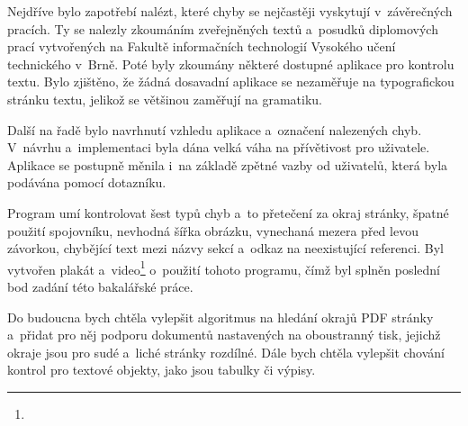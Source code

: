 Nejdříve bylo zapotřebí nalézt, které chyby se nejčastěji vyskytují v~závěrečných
pracích. Ty se nalezly zkoumáním zveřejněných textů a~posudků diplomových prací
vytvořených na Fakultě informačních technologií Vysokého učení technického v~Brně.
Poté byly zkoumány některé dostupné aplikace pro kontrolu textu. Bylo zjištěno,
že žádná dosavadní aplikace se nezaměřuje na typografickou stránku textu, jelikož
se většinou zaměřují na gramatiku.

Další na řadě bylo navrhnutí vzhledu aplikace a~označení nalezených chyb.
V~návrhu a~implementaci byla dána velká váha na přívětivost pro uživatele.
Aplikace se postupně měnila i~na základě zpětné vazby od uživatelů, která byla
podávána pomocí dotazníku.

Program umí kontrolovat šest typů chyb a~to přetečení za okraj stránky, 
špatné použití spojovníku, nevhodná šířka obrázku, vynechaná mezera před levou
závorkou, chybějící text mezi názvy sekcí a~odkaz na neexistující referenci.
Byl vytvořen plakát a~video\footnote{} o~použití 
tohoto programu, čímž byl splněn poslední bod zadání této bakalářské práce.

Do budoucna bych chtěla vylepšit algoritmus na hledání okrajů PDF stránky
a~přidat pro něj podporu dokumentů nastavených na oboustranný tisk, jejichž
okraje jsou pro sudé a~liché stránky rozdílné. Dále bych chtěla vylepšit chování
kontrol pro textové objekty, jako jsou tabulky či výpisy.











%
